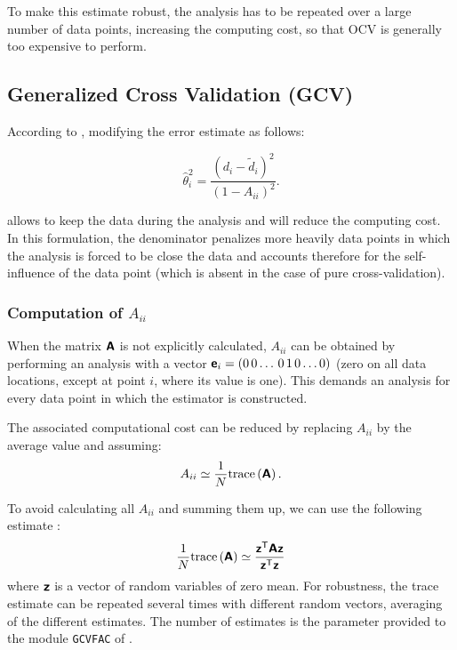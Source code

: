 To make this estimate robust, the analysis has to be repeated over a large number of data points, increasing the computing cost, so that OCV is generally too expensive to perform.


\subsection{Generalized Cross Validation (GCV)}

According to \cite{CRAVEN78}, modifying the error estimate as follows:

\begin{equation}
{\hat{\theta}_i^2} =  \frac{(d_i - \tilde{d}_i)^2}{(1 - A_{ii})^2}.
\label{eq:misfitestimate}
\end{equation}

allows to keep the data during the analysis and will reduce the computing cost. In this formulation, the denominator penalizes more heavily data points in which the analysis is forced to be close the data and accounts therefore for the self-influence of the data point (which is absent in the case of pure cross-validation).

\subsubsection{Computation of $A_{ii}$}

When the matrix $\mbox{\boldmath $ \protect\mathsf{A} $}$ is not explicitly calculated, $A_{ii}$ can be obtained by performing an analysis with a vector $\mbox{\boldmath $ \protect\mathsf{e} $}_i=(0\,0\ldots\,0\,1\,0\ldots 0)$ (zero on all data locations, except at point $i$, where its value is one). This demands an analysis for every data point in which the estimator is constructed.

The associated computational cost can be reduced by  replacing $A_{ii}$ by the average value and assuming:
\begin{equation}
A_{ii} \simeq \frac{1}{N} \mathrm{trace}\left( \mbox{\boldmath $ \protect\mathsf{A} $} \right).
\label{eq:aiitrace}
\end{equation}

To avoid calculating all $A_{ii}$ and summing them up, we can use the following estimate \citep{GIRARD89}:
\begin{equation}
\frac{1}{N} \mathrm{trace}\left( \mbox{\boldmath $ \protect\mathsf{A} $} \right) \simeq  \frac{ {\mbox{\boldmath $ \protect\mathsf{z} $}}^\mathsf{T} \mbox{\boldmath $ \protect\mathsf{A} $} \mbox{\boldmath $ \protect\mathsf{z} $} }{{\mbox{\boldmath $ \protect\mathsf{z} $}}^\mathsf{T} \mbox{\boldmath $ \protect\mathsf{z} $} }
\label{eq:traceest}
\end{equation}
where $\mbox{\boldmath $ \protect\mathsf{z} $}$ is a vector of random variables of zero mean. For robustness, the trace estimate can be repeated several times with different random vectors, averaging of the different estimates. The number of estimates is the parameter provided to the module \texttt{GCVFAC} of \diva.

